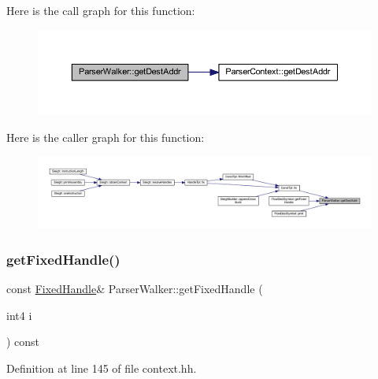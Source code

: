 Here is the call graph for this function\+:
\nopagebreak
\begin{figure}[H]
\begin{center}
\leavevmode
\includegraphics[width=350pt]{class_parser_walker_a8593ab995c8656e789b3b6aa933a4147_cgraph}
\end{center}
\end{figure}
Here is the caller graph for this function\+:
\nopagebreak
\begin{figure}[H]
\begin{center}
\leavevmode
\includegraphics[width=350pt]{class_parser_walker_a8593ab995c8656e789b3b6aa933a4147_icgraph}
\end{center}
\end{figure}
\mbox{\label{class_parser_walker_af3212cb092a2501f0a16bf4ef9618cdb}} 
\subsubsection{\texorpdfstring{getFixedHandle()}{getFixedHandle()}}
{\footnotesize\ttfamily const \mbox{\hyperlink{struct_fixed_handle}{Fixed\+Handle}}\& Parser\+Walker\+::get\+Fixed\+Handle (\begin{DoxyParamCaption}\item[{int4}]{i }\end{DoxyParamCaption}) const\hspace{0.3cm}{\ttfamily [inline]}}



Definition at line 145 of file context.\+hh.

